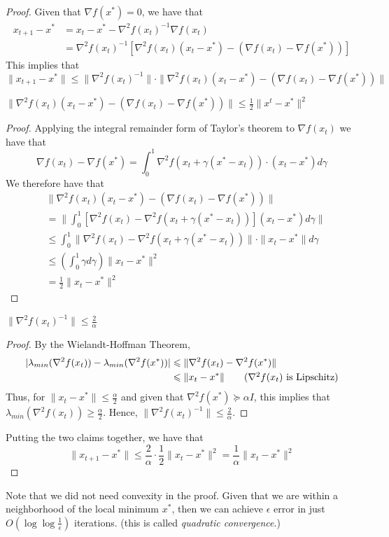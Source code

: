 \begin{proof}
Given that $\nabla f(x^*) = 0$, we have that
\begin{align*}
x_{t+1} - x^* &= x_t - x^* - \nabla^2 f(x_t)^{-1} \nabla f(x_t) \\
&= \nabla^2 f(x_t)^{-1} [\nabla^2 f(x_t)(x_t - x^*) - (\nabla f(x_t) - \nabla f(x^*))]
\end{align*}
This implies that
\[
\|x_{t+1} - x^* \| \leq 
\|\nabla^2 f(x_t)^{-1} \| \cdot 
\|\nabla^2 f(x_t)(x_t - x^*) - (\nabla f(x_t) - \nabla f(x^*))\|
\]
%
\begin{claim}
$\|\nabla^2 f(x_t)(x_t - x^*) - (\nabla f(x_t) - \nabla f(x^*))\|
\le \frac{1}{2} \| x^t - x^* \|^2$
\end{claim}
\begin{proof}
Applying the integral remainder form of Taylor's theorem to $\nabla f(x_t)$ we have that
$$\nabla f(x_t) - \nabla f(x^*) = \int_{0}^{1} \nabla^2 f(x_t + \gamma (x^* - x_t)) \cdot (x_t - x^*) d\gamma$$
We therefore have that
\begin{align*}
&\|\nabla^2 f(x_t)(x_t - x^*) - (\nabla f(x_t) - \nabla f(x^*))\| \\
&= \|\int_{0}^{1} [\nabla^2 f(x_t) - \nabla^2 f(x_t + \gamma (x^* - x_t))](x_t - x^*) d\gamma \| \\
&\leq \int_{0}^{1} \|\nabla^2 f(x_t) - \nabla^2 f(x_t + \gamma (x^* - x_t))\| \cdot \|x_t - x^*\| d\gamma \\
&\leq \left( \int_{0}^{1} \gamma d\gamma \right) \|x_t - x^*\|^2 \tag{$\nabla^2 f(x_t)$ is Lipschitz}\\
&= \frac{1}{2}\|x_t - x^*\|^2
\end{align*}
\end{proof}

\begin{claim}
$\|\nabla^2 f(x_t)^{-1}\| \leq \frac{2}{\alpha} $ 
\end{claim}
\begin{proof}
By the Wielandt-Hoffman Theorem,
\begin{align*}
\lvert\lambda_{min}(\nabla^2 f(x_t)) - \lambda_{min}(\nabla^2 f(x^*))\rvert &\leqslant \|\nabla^2 f(x_t) - \nabla^2 f(x^*) \| \\
&\leqslant \|x_t - x^*\| \tag{$\nabla^2 f(x_t)$ is Lipschitz}
\end{align*}
Thus, for $\|x_t - x^*\| \leq \frac{\alpha}{2}$ and given that $\nabla^2 f(x^*) \succeq \alpha I$, this implies that $\lambda_{min}(\nabla^2 f(x_t)) \geq \frac{\alpha}{2}$. Hence, $\| \nabla^2 f(x_t)^{-1} \| \leq \frac{2}{\alpha}$.
\end{proof}
Putting the two claims together, we have that
$$\|x_{t+1} - x^*\| \leq \frac{2}{\alpha} \cdot \frac{1}{2} \|x_t - x^*\|^2 = \frac{1}{\alpha} \|x_t - x^*\|^2$$
\end{proof}
Note that we did not need convexity in the proof. Given that we are within a neighborhood of the local minimum $x^*$, then we can achieve $\epsilon$ error in just $O(\log \log \frac{1}{\epsilon})$ iterations. (this is called \emph{quadratic convergence}.)

